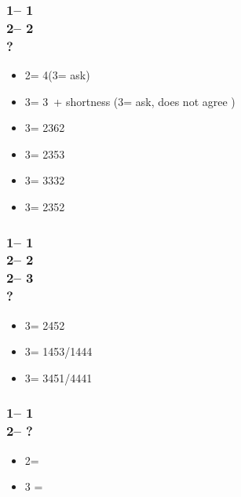 \documentclass[12pt, a4paper]{report}
\begin{document}
{{        \subsubsection*{1\diams -- 1\hearts\\
                        2\hearts -- 2\spades\\
                        ?}
        \begin{itemize}
            \item 2\nt = 4\hearts (3\clubs = ask)
            \item 3\clubs = 3\hearts\ + shortness (3\diams = ask, does not agree \hearts)
            \item 3\diams = 2362
            \item 3\hearts = 2353
            \item 3\spades = 3332
            \item 3\nt = 2352
        \end{itemize}

        \subsubsection*{1\diams -- 1\hearts\\
                        2\hearts -- 2\spades\\
                        2\nt -- 3\clubs\\
                        ?}
        \begin{itemize}
            \item 3\diams = 2452
            \item 3\hearts = 1453/1444
            \item 3\spades = 3451/4441
        \end{itemize}

        \subsubsection*{1\diams -- 1\spades\\
                        2\spades -- ?}
        \begin{itemize}
            \item 2\nt = \gf
            \item 3 = \inv
        \end{itemize}

}}
\end{document}
